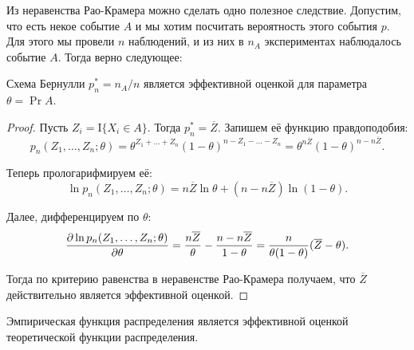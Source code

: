 Из неравенства Рао-Крамера можно сделать одно полезное следствие. Допустим, что 
есть некое событие \(A\) и мы хотим посчитать вероятность этого события \(p\). 
Для этого мы провели \(n\) наблюдений, и из них в \(n_{A}\) экспериментах 
наблюдалось событие \(A\). Тогда верно следующее:
\begin{theorem}
	Схема Бернулли \(p_{n}^{*} = n_{A}/n\) является эффективной оценкой для 
	параметра \(\theta = \Pr{A}\).
\end{theorem}
\begin{proof}
	Пусть \(Z_{i} = \mathrm{I}\{X_{i} \in A\}\). Тогда \(p_{n}^{*} = 
	\overline{Z}\). Запишем её функцию правдоподобия:
	\[
		p_{n}(Z_{1}, \dots, Z_{n}; \theta) = \theta^{Z_{1} + \dots + Z_{n}}(1 - 
		\theta)^{n - Z_{1} - \dots - Z_{n}} = \theta^{n\overline{Z}}(1 
		- \theta)^{n - n\overline{Z}}.
	\]
	
	Теперь прологарифмируем её:
	\[
		\ln p_{n}(Z_{1}, \dots, Z_{n}; \theta) = n\overline{Z}\ln{\theta} + (n 
		- n\overline{Z})\ln(1 - \theta).
	\]
	
	Далее, дифференцируем по \(\theta\):
	\[
		\frac{\partial\ln p_n(Z_{1}, \dots, Z_{n}; \theta)}{\partial \theta} = \frac{n\overline{Z}}{\theta} - \frac{n - 
		n\overline{Z}}{1 - \theta} = \frac{n}{\theta(1 - \theta)}(\overline{Z} 
		- \theta).
	\]
	
	Тогда по критерию равенства в неравенстве Рао-Крамера получаем, что 
	\(\overline{Z}\) действительно является эффективной оценкой.
\end{proof}
\begin{consequence}
	Эмпирическая функция распределения является эффективной оценкой 
	теоретической функции распределения.
\end{consequence}